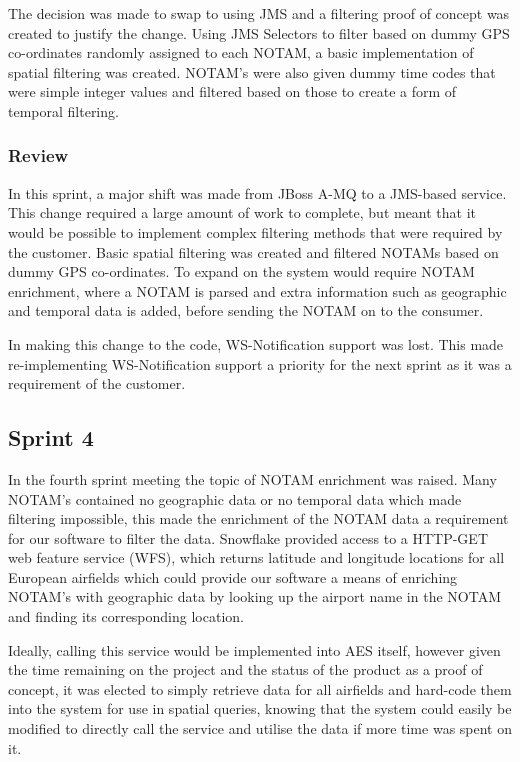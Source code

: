 \documentclass[a4paper, 12pt, twoside]{article}
\begin{document}
The decision was made to swap to using JMS and a filtering proof of concept was created to justify the change. Using JMS Selectors to filter based on dummy GPS co-ordinates randomly assigned to each NOTAM, a basic implementation of spatial filtering was created. NOTAM's were also given dummy time codes that were simple integer values and filtered based on those to create a form of temporal filtering.

\subsubsection{Review}

In this sprint, a major shift was made from JBoss A-MQ to a JMS-based service. This change required a large amount of work to complete, but meant that it would be possible to implement complex filtering methods that were required by the customer. Basic spatial filtering was created and filtered NOTAMs based on dummy GPS co-ordinates. To expand on the system would require NOTAM enrichment, where a NOTAM is parsed and extra information such as geographic and temporal data is added, before sending the NOTAM on to the consumer.

In making this change to the code, WS-Notification support was lost. This made re-implementing WS-Notification support a priority for the next sprint as it was a requirement of the customer.

\subsection{Sprint 4}
\label{sec:impl_sprint_4}

In the fourth sprint meeting the topic of NOTAM enrichment was raised. Many NOTAM's contained no geographic data or no temporal data which made filtering impossible, this made the enrichment of the NOTAM data a requirement for our software to filter the data. Snowflake provided access to a HTTP-GET web feature service (WFS), which returns latitude and longitude locations for all European airfields which could provide our software a means of enriching NOTAM's with geographic data by looking up the airport name in the NOTAM and finding its corresponding location.

Ideally, calling this service would be implemented into AES itself, however given the time remaining on the project and the status of the product as a proof of concept, it was elected to simply retrieve data for all airfields and hard-code them into the system for use in spatial queries, knowing that the system could easily be modified to directly call the service and utilise the data if more time was spent on it.
\end{document}
